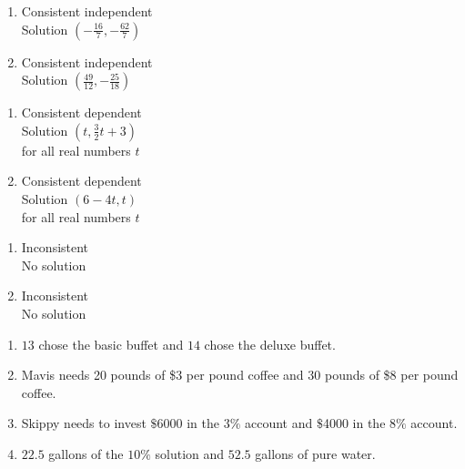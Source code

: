 \documentclass{ximera}
\begin{document}
\begin{multicols}{2}
\begin{enumerate}
\setcounter{enumi}{\value{HW}}

\item  Consistent independent \\
Solution $\left(-\frac{16}{7}, -\frac{62}{7}\right)$  

\item Consistent independent \\
Solution $\left(\frac{49}{12}, -\frac{25}{18}\right)$

\setcounter{HW}{\value{enumi}}
\end{enumerate}
\end{multicols}

\begin{multicols}{2}
\begin{enumerate}
\setcounter{enumi}{\value{HW}}

\item  Consistent dependent\\
Solution $\left(t, \frac{3}{2}t+3\right)$ \\
for all real numbers $t$

\item  Consistent dependent\\
Solution $\left(6-4t, t\right)$ \\
for all real numbers $t$

\setcounter{HW}{\value{enumi}}
\end{enumerate}
\end{multicols}



\begin{multicols}{2}
\begin{enumerate}
\setcounter{enumi}{\value{HW}}

\item  Inconsistent \\
No solution

\item   Inconsistent \\
No solution


\setcounter{HW}{\value{enumi}}
\end{enumerate}
\end{multicols}

\begin{enumerate}
\setcounter{enumi}{\value{HW}}

\item  $13$ chose the basic buffet and $14$ chose the deluxe buffet.

\item Mavis needs 20 pounds of \$3 per pound coffee and 30 pounds of \$8 per pound coffee.

\item  Skippy needs to invest $\$$6000 in the $3\%$ account and $\$$4000 in the $8 \%$ account.

\item  $22.5$ gallons of the $10 \%$ solution and $52.5$ gallons of pure water.

\end{enumerate}
\end{document}
